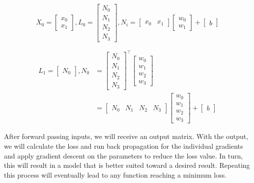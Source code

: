\begin{equation*}
    X_0 = 
        \begin{bmatrix}
            x_0 \\
            x_1
        \end{bmatrix},
     L_0 = 
        \begin{bmatrix}
            N_0 \\
            N_1 \\
            N_2 \\
            N_3
        \end{bmatrix}, 
    N_i = 
        \begin{bmatrix}
            x_0 & x_1 
        \end{bmatrix}
        \begin{bmatrix}
            w_0 \\
            w_1
        \end{bmatrix} + 
        \begin{bmatrix}
            b
        \end{bmatrix}
\end{equation*}

\begin{align*}
    L_1 = 
        \begin{bmatrix}
            N_0
        \end{bmatrix},
    N_0 &= 
        \begin{bmatrix}
            N_0 \\
            N_1 \\
            N_2 \\
            N_3
        \end{bmatrix}^{\top}
        \begin{bmatrix}
            w_0 \\
            w_1 \\
            w_2 \\
            w_3
        \end{bmatrix} \\
        &=
        \begin{bmatrix}
            N_0 & N_1 & N_2 & N_3
        \end{bmatrix}
        \begin{bmatrix}
            w_0 \\
            w_1 \\
            w_2 \\
            w_3
        \end{bmatrix} + 
        \begin{bmatrix}
            b
        \end{bmatrix}
\end{align*}

After forward passing inputs, we will receive an output matrix. With the output, we will calculate the loss and
run back propagation for the individual gradients and apply gradient descent on the parameters to reduce the loss value.
In turn, this will result in a model that is better suited toward a desired result. Repeating this process will
eventually lead to any function reaching a minimum loss.